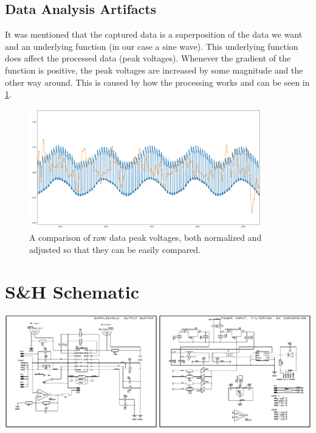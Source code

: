\documentclass[a4paper, 10pt]{article}
\begin{document}
\subsection{Data Analysis Artifacts}
It was mentioned that the captured data is a superposition of the data we want and an underlying function (in our case a sine wave).
This underlying function does affect the processed data (peak voltages).
Whenever the gradient of the function is positive, the peak voltages are increased by some magnitude and the other way around.
This is caused by how the processing works and can be seen in \cref{fig:soft-ys-pys-corr}.

\begin{figure}[H]
    \centering
    \includegraphics[width=0.9\textwidth]{./images/soft-ys-pys-corr.png}
    \caption{A comparison of raw data peak voltages, both normalized and adjusted so that they can be easily compared.}
    \label{fig:soft-ys-pys-corr}
\end{figure}

\vspace{10em}
\appendix

\section{S\&H Schematic}\label{sec:sample-hold-schema}
\includegraphics[width=\textwidth]{./appendices/S&H_Scheme.pdf}
\end{document}
